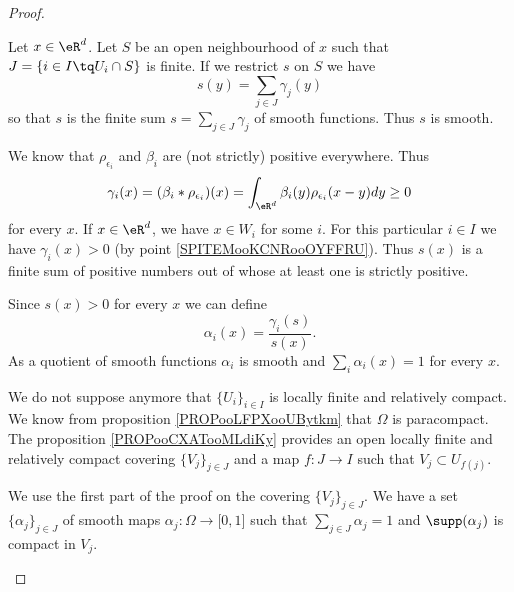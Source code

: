 \begin{proof}
\begin{subproof}
\begin{subproof}
			Let \( x\in \eR^d\). Let \( S\) be an open neighbourhood of \( x\) such that \( J=\{ i\in I\tq U_i\cap S \}\) is finite. If we restrict \( s\) on \( S\) we have
			\begin{equation}
				s(y)=\sum_{j\in J}\gamma_j(y)
			\end{equation}
			so that \( s\) is the finite sum \( s=\sum_{j\in J}\gamma_j\) of smooth functions. Thus \( s\) is smooth.

			We know that \( \rho_{\epsilon_i}\) and \( \beta_i\) are (not strictly) positive everywhere. Thus
			\begin{equation}
				\gamma_i(x)=(\beta_i*\rho_{\epsilon_i})(x)=\int_{\eR^d}\beta_i(y)\rho_{\epsilon_i}(x-y)dy\geq 0
			\end{equation}
			for every \( x\). If \( x\in \eR^d\), we have \( x\in W_i\) for some \( i\). For this particular \( i\in I\) we have \( \gamma_i(x)>0\) (by point \ref{SPITEMooKCNRooOYFFRU}). Thus \( s(x)\) is a finite sum of positive numbers out of whose at least one is strictly positive.

			Since \( s(x)>0\) for every \( x\) we can define
			\begin{equation}
				\alpha_i(x)=\frac{ \gamma_i(s) }{ s(x) }.
			\end{equation}
			As a quotient of smooth functions \( \alpha_i\) is smooth and \( \sum_i\alpha_i(x)=1\) for every \( x\).
		\end{subproof}

				\label{ITEMooADGPooEsplza}
		We do not suppose anymore that \( \{ U_i \}_{i\in I}\) is locally finite and relatively compact. We know from proposition \ref{PROPooLFPXooUBytkm} that \( \Omega\) is paracompact. The proposition \ref{PROPooCXATooMLdiKy} provides an open locally finite and relatively compact covering \( \{ V_j \}_{j\in J}\) and a map \(f \colon J\to I  \) such that \( V_j\subset U_{f(j)}\).

		We use the first part of the proof on the covering \( \{ V_j \}_{j\in J}\). We have a set \( \{ \alpha_j \}_{j\in J}\) of smooth maps \(\alpha_j \colon \Omega\to \mathopen[ 0,1\mathclose]  \) such that \( \sum_{j\in J}\alpha_j=1\) and \( \supp(\alpha_j)\) is compact in \( V_j\).


\end{subproof}
\end{proof}
